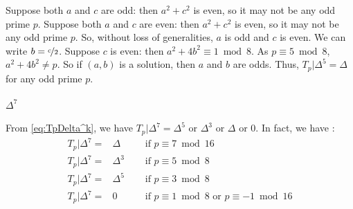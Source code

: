 Suppose both $a$ and $c$ are odd: then $a^2+c^2$ is even, so it may not be any odd prime $p$.
Suppose both $a$ and $c$ are even: then $a^2+c^2$ is even, so it may not be any odd prime $p$.
So, without loss of generalities, $a$ is odd and $c$ is even. We can write $b=\nicefrac{c}{2}$.
Suppose $c$ is even: then $a^2+4b^2 \equiv 1 \bmod 8$. As $p \equiv 5 \bmod 8$, $a^2+4b^2 \neq p$.
So if $(a,b)$ is a solution, then $a$ and $b$ are odds.
Thus, $T_p|\Delta^5=\Delta$ for any odd prime $p$.

\paragraph{$\Delta^7$}
From \eqref{eq:TpDelta^k}, we have $T_p|\Delta^7 = \Delta^5 \text{ or } \Delta^3 \text{ or } \Delta \text{ or } 0$.
In fact, we have \cite[2.3]{OrdreNilpotenceOperateurHecke}:
$$
\begin{array}{rll}
	T_p|\Delta^7=& \Delta   & \quad \text{ if } p \equiv 7 \bmod 16 \\
	T_p|\Delta^7=& \Delta^3 & \quad \text{ if } p \equiv 5 \bmod 8 \\
	T_p|\Delta^7=& \Delta^5 & \quad \text{ if } p \equiv 3 \bmod 8 \\
	T_p|\Delta^7=& 0        & \quad \text{ if } p \equiv 1 \bmod 8 \text{ or } p \equiv -1 \bmod 16
\end{array}
$$

